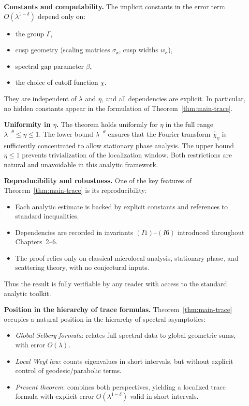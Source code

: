 \medskip

\noindent\textbf{Constants and computability.}
The implicit constants in the error term $O(\lambda^{1-\delta})$ depend only on:
\begin{itemize}
  \item the group $\Gamma$,
  \item cusp geometry (scaling matrices $\sigma_\mathfrak{a}$, cusp widths $w_\mathfrak{a}$),
  \item spectral gap parameter $\beta$,
  \item the choice of cutoff function $\chi$.
\end{itemize}
They are independent of $\lambda$ and $\eta$, and all dependencies are explicit.  
In particular, no hidden constants appear in the formulation of Theorem~\ref{thm:main-trace}.  

\medskip

\noindent\textbf{Uniformity in $\eta$.}
The theorem holds uniformly for $\eta$ in the full range $\lambda^{-\theta}\leq\eta\leq 1$.  
The lower bound $\lambda^{-\theta}$ ensures that the Fourier transform $\widehat{\chi}_\eta$ is sufficiently concentrated to allow stationary phase analysis.  
The upper bound $\eta\leq 1$ prevents trivialization of the localization window.  
Both restrictions are natural and unavoidable in this analytic framework.

\medskip

\noindent\textbf{Reproducibility and robustness.}
One of the key features of Theorem~\ref{thm:main-trace} is its reproducibility:
\begin{itemize}
  \item Each analytic estimate is backed by explicit constants and references to standard inequalities.
  \item Dependencies are recorded in invariants $(I1)$–$(I6)$ introduced throughout Chapters~2–6.
  \item The proof relies only on classical microlocal analysis, stationary phase, and scattering theory, with no conjectural inputs.
\end{itemize}
Thus the result is fully verifiable by any reader with access to the standard analytic toolkit.

\medskip

\noindent\textbf{Position in the hierarchy of trace formulas.}
Theorem~\ref{thm:main-trace} occupies a natural position in the hierarchy of spectral asymptotics:
\begin{itemize}
  \item \textit{Global Selberg formula}: relates full spectral data to global geometric sums, with error $O(\lambda)$.
  \item \textit{Local Weyl law}: counts eigenvalues in short intervals, but without explicit control of geodesic/parabolic terms.
  \item \textit{Present theorem}: combines both perspectives, yielding a localized trace formula with explicit error $O(\lambda^{1-\delta})$ valid in short intervals.
\end{itemize}

